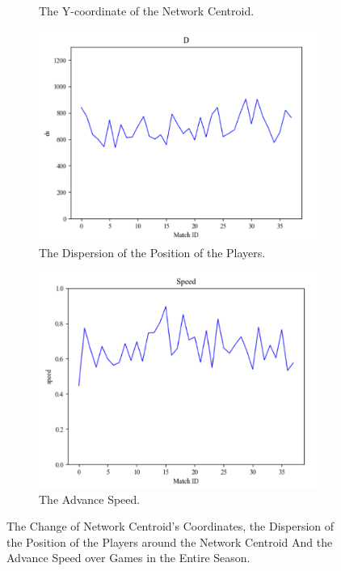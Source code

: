 \documentclass{mcmthesis}
\begin{document}
\begin{figure}[h]
\begin{subfigure}[b]{0.5\textwidth}
			\caption{The Y-coordinate of the Network Centroid.}
			\label{fig:y2}
		\end{subfigure}
		\begin{subfigure}[b]{0.5\textwidth}
			\includegraphics[width=\textwidth]{figures/d2.png}
			\caption{The Dispersion of the Position of the Players.}
			\label{fig:d2}
		\end{subfigure}%
		\begin{subfigure}[b]{0.5\textwidth}
			\includegraphics[width=\textwidth]{figures/s2.png}
			\caption{The Advance Speed.}
			\label{fig:s2}
		\end{subfigure}
		\caption{The Change of Network Centroid's Coordinates, the Dispersion of the Position of the Players around the Network Centroid And the Advance Speed over Games in the Entire Season.}\label{fig:season}
	\end{figure}
\end{document}
